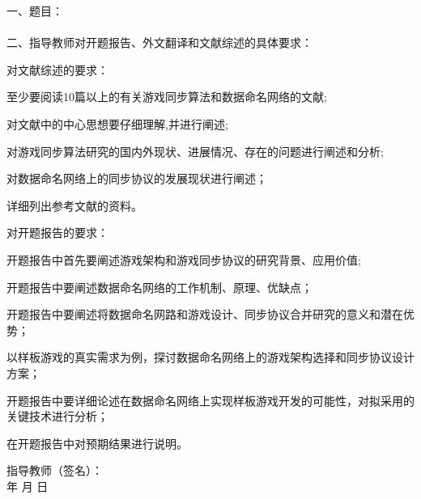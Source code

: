 
\newpage
\thispagestyle{empty}

\begin{tabbing}
\hspace{5mm}\songti\sihao 一、题目：\underline{}
\\ \\
\hspace{5mm}\songti\sihao 二、指导教师对开题报告、外文翻译和文献综述的具体要求：
\end{tabbing}

对文献综述的要求：
\begin{itemize*}
\item 至少要阅读10篇以上的有关游戏同步算法和数据命名网络的文献;
\item 对文献中的中心思想要仔细理解,并进行阐述;
\item 对游戏同步算法研究的国内外现状、进展情况、存在的问题进行阐述和分析;
\item 对数据命名网络上的同步协议的发展现状进行阐述；
\item 详细列出参考文献的资料。
\end{itemize*}

对开题报告的要求：
\begin{itemize*}
\item 开题报告中首先要阐述游戏架构和游戏同步协议的研究背景、应用价值;
\item 开题报告中要阐述数据命名网络的工作机制、原理、优缺点；
\item 开题报告中要阐述将数据命名网路和游戏设计、同步协议合并研究的意义和潜在优势；
\item 以样板游戏的真实需求为例，探讨数据命名网络上的游戏架构选择和同步协议设计方案；
\item 开题报告中要详细论述在数据命名网络上实现样板游戏开发的可能性，对拟采用的关键技术进行分析；
\item 在开题报告中对预期结果进行说明。
\end{itemize*}
\vspace{70mm}

\begin{tabbing}
\hspace{80mm}\songti\xiaosi 指导教师（签名）：
\\ \hspace{90mm} \songti\xiaosi 年 \hspace{5mm} \songti\xiaosi 月 \hspace{5mm} \songti\xiaosi 日
\end{tabbing}

